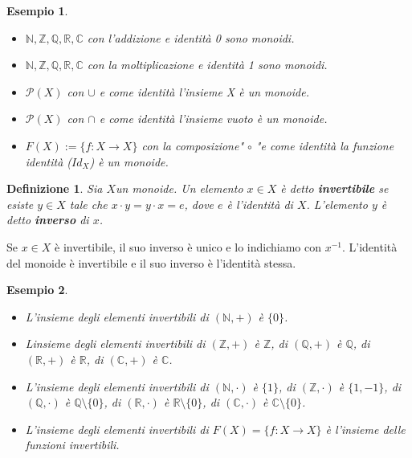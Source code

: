 \documentclass[a4paper,12pt]{article}
\theoremstyle{def}
\newtheorem*{definition}{Definizione}
\theoremstyle{prop}
\theoremstyle{esempio}
\newtheorem*{example}{Esempio}
\theoremstyle{dimostrazione}
\theoremstyle{teo}
\theoremstyle{osservazione}
\begin{document}
\begin{example}
    \
    \begin{itemize}
        \item \(\mathbb{N,Z,Q,R,C}\) con l'addizione e identità 0 sono monoidi.
        \item \(\mathbb{N,Z,Q,R,C}\) con la moltiplicazione e identità 1 sono monoidi.
        \item \(\mathcal{P} (X)\) con \(\cup\)  e come identità l'insieme X è un monoide.
        \item \(\mathcal{P} (X)\) con \(\cap\)  e come identità l'insieme vuoto è un monoide.
        \item \(F(X):= \{f: X \rightarrow X\}\) con la composizione" \(\circ\) "e come identità
              la funzione identità (\(Id_X\)) è un monoide.
    \end{itemize}
\end{example}

\begin{definition}
    Sia \(X \)un monoide. Un elemento \(x \in X\) è detto \textbf{invertibile} se esiste \(y \in X\) tale che
    \(x \cdot y = y \cdot x = e\), dove \(e\) è l'identità di \(X\). L'elemento \(y\) è detto \textbf{inverso} di \(x\).
\end{definition}

Se \(x \in X\) è invertibile, il suo inverso è unico e lo indichiamo con \(x^{-1}\).\newline
L'identità del monoide è invertibile e il suo inverso è l'identità stessa.

\begin{example}
    \
    \begin{itemize}
        \item L'insieme degli elementi invertibili di \((\mathbb{N},+)\) è \(\{0\}\).
        \item Linsieme degli elementi invertibili di \((\mathbb{Z},+)\) è \(\mathbb{Z}\), di \((\mathbb{Q},+)\)
              è \(\mathbb{Q}\), di \((\mathbb{R},+)\) è \(\mathbb{R}\), di \((\mathbb{C},+)\) è \(\mathbb{C}\).
        \item L'insieme degli elementi invertibili di \((\mathbb{N},\cdot)\) è \(\{1\}\), di \((\mathbb{Z},\cdot)\)
              è \(\{1,-1\}\), di \((\mathbb{Q},\cdot)\) è \(\mathbb{Q} \setminus \{0\}\), di \((\mathbb{R},\cdot)\) è
              \(\mathbb{R} \setminus \{0\}\), di \((\mathbb{C},\cdot)\) è \(\mathbb{C} \setminus \{0\}\).
        \item L'insieme degli elementi invertibili di \(F(X) = \{f: X \rightarrow X\}\) è l'insieme delle funzioni
              invertibili.
    \end{itemize}
\end{example}
\end{document}

